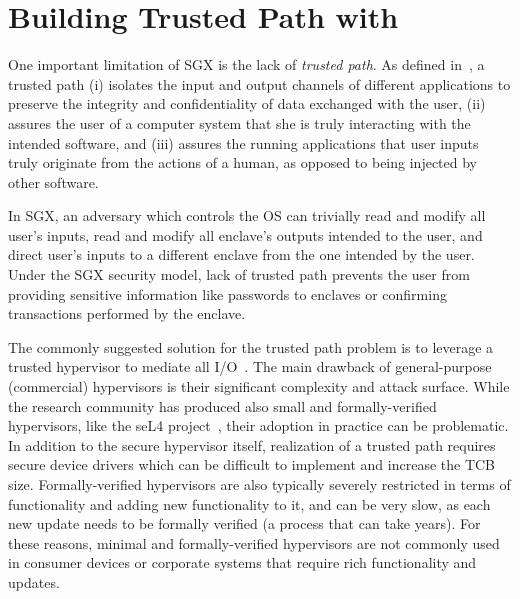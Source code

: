 
\section{Building Trusted Path with \name}
\label{sec:secureInput}


One important limitation of SGX is the lack of \emph{trusted path}. As defined in~\cite{filyanov2011uni}, a trusted path (i) isolates the input and output channels of different applications to preserve the integrity and confidentiality of data exchanged with the user, (ii) assures the user of a computer system that she is truly interacting with the intended software, and (iii) assures the running applications that user inputs truly originate from the actions of a human, as opposed to being injected by other software.

In SGX, an adversary which controls the OS can trivially read and modify all user's inputs, read and modify all enclave's outputs intended to the user, and direct user's inputs to a different enclave from the one intended by the user. Under the SGX security model, lack of trusted path prevents the user from providing sensitive information like passwords to enclaves or confirming transactions performed by the enclave.


The commonly suggested solution for the trusted path problem is to leverage a trusted hypervisor to mediate all I/O~\cite{weiser2017sgxio}. The main drawback of general-purpose (commercial) hypervisors is their significant complexity and attack surface. While the research community has produced also small and formally-verified hypervisors, like the seL4 project~\cite{klein2009sel4}, their adoption in practice can be problematic. In addition to the secure hypervisor itself, realization of a trusted path requires secure device drivers which can be difficult to implement and increase the TCB size. Formally-verified hypervisors are also typically severely restricted in terms of functionality and adding new functionality to it, and can be very slow, as each new update needs to be formally verified (a process that can take years). For these reasons, minimal and formally-verified hypervisors are not commonly used in consumer devices or corporate systems that require rich functionality and updates.

